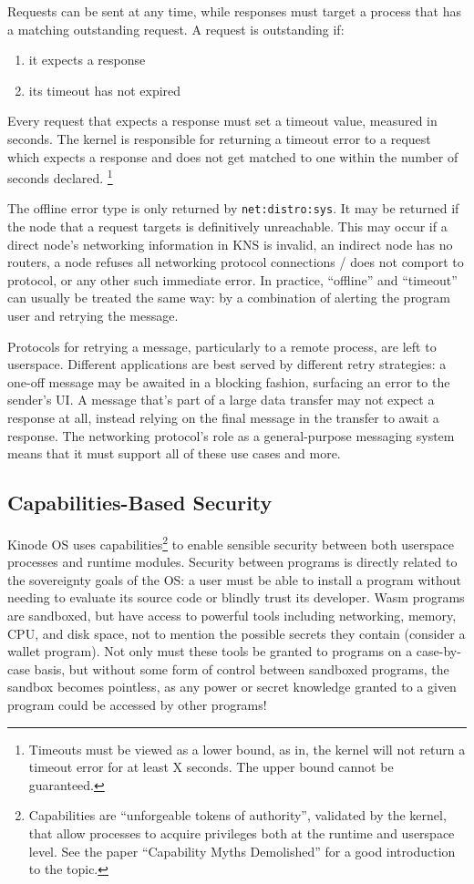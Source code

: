 \documentclass[runningheads]{llncs}
\begin{document}
Requests can be sent at any time, while responses must target a process that has a matching outstanding request.
A request is outstanding if:
\begin{enumerate}
    \item it expects a response
    \item its timeout has not expired
\end{enumerate}
Every request that expects a response must set a timeout value, measured in seconds.
The kernel is responsible for returning a timeout error to a request which expects a response and does not get matched to one within the number of seconds declared.
\footnote{Timeouts must be viewed as a lower bound, as in, the kernel will not return a timeout error for at least X seconds. The upper bound cannot be guaranteed.}

The offline error type is only returned by \verb|net:distro:sys|.
It may be returned if the node that a request targets is definitively unreachable.
This may occur if a direct node's networking information in KNS is invalid, an indirect node has no routers, a node refuses all networking protocol connections / does not comport to protocol, or any other such immediate error.
In practice, ``offline'' and ``timeout'' can usually be treated the same way: by a combination of alerting the program user and retrying the message.

Protocols for retrying a message, particularly to a remote process, are left to userspace.
Different applications are best served by different retry strategies:
a one-off message may be awaited in a blocking fashion, surfacing an error to the sender's UI.
A message that's part of a large data transfer may not expect a response at all, instead relying on the final message in the transfer to await a response.
The networking protocol's role as a general-purpose messaging system means that it must support all of these use cases and more.

\subsection{Capabilities-Based Security}
\label{sec:oscapabilities}

Kinode OS uses capabilities\footnote{Capabilities are ``unforgeable tokens of authority'', validated by the kernel, that allow processes to acquire privileges both at the runtime and userspace level.
See the paper ``Capability Myths Demolished'' for a good introduction to the topic.}
to enable sensible security between both userspace processes and runtime modules.
Security between programs is directly related to the sovereignty goals of the OS: a user must be able to install a program without needing to evaluate its source code or blindly trust its developer.
Wasm programs are sandboxed, but have access to powerful tools including networking, memory, CPU, and disk space, not to mention the possible secrets they contain (consider a wallet program).
Not only must these tools be granted to programs on a case-by-case basis, but without some form of control between sandboxed programs, the sandbox becomes pointless, as any power or secret knowledge granted to a given program could be accessed by other programs!
\end{document}
